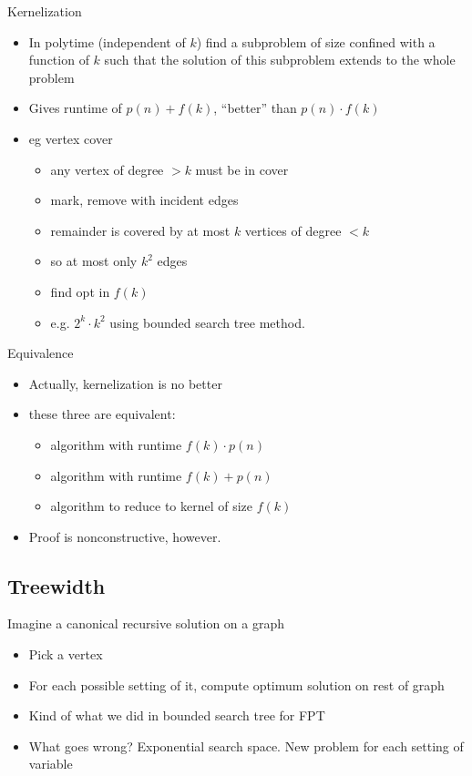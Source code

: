 \documentclass{article}
\begin{document}
Kernelization
\begin{itemize}
\item In polytime (independent of $k$) find a subproblem of size confined with a function of $k$ such that the
  solution of this subproblem extends to the whole problem
\item Gives runtime of $p(n)+f(k)$, ``better'' than $p(n)\cdot f(k)$
\item eg vertex cover
\begin{itemize}
\item any vertex of degree $>k$ must be in cover
\item mark, remove with incident edges
\item remainder is covered by at most $k$ vertices of degree $<k$
\item so at most only $k^2$ edges
\item find opt in $f(k)$
\item e.g. $2^k \cdot k^2$ using bounded search tree method.
\end{itemize}
\end{itemize}

Equivalence
\begin{itemize}
\item Actually, kernelization is no better
\item these three are equivalent:
\begin{itemize}
\item algorithm with runtime $f(k)\cdot p(n)$
\item algorithm with runtime $f(k)+p(n)$
\item algorithm to reduce to kernel of size $f(k)$
\end{itemize}
\item Proof is nonconstructive, however.
\end{itemize}



\subsection{Treewidth}
Imagine a canonical recursive solution on a graph
\begin{itemize}
\item Pick a vertex
\item For each possible setting of it, compute optimum solution on
  rest of graph
\item Kind of what we did in bounded search tree for FPT
\item What goes wrong?  Exponential search space.  New problem for
  each setting of variable
\end{itemize}
\end{document}
